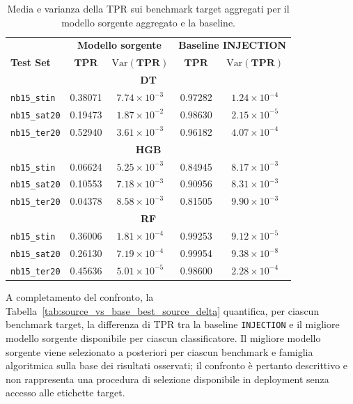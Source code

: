 \begin{table}[H]
    \centering
    \footnotesize
    \caption{Media e varianza della TPR sui benchmark target aggregati per il modello sorgente aggregato e la baseline.}
    \label{tab:source_vs_base_target_variance}
    \begin{tabular}{lcccc}
        \toprule
        & \multicolumn{2}{c}{\textbf{Modello sorgente}} & \multicolumn{2}{c}{\textbf{Baseline INJECTION}} \\
        \textbf{Test Set} & $\boldsymbol{\overline{TPR}}$ & $\boldsymbol{\mathrm{Var}(TPR)}$ & $\boldsymbol{\overline{TPR}}$ & $\boldsymbol{\mathrm{Var}(TPR)}$ \\
        \midrule
        \multicolumn{5}{c}{\textbf{DT}} \\
        \midrule
        \texttt{nb15\_stin}  & 0.38071 & $7.74\times10^{-3}$ & 0.97282 & $1.24\times10^{-4}$ \\
        \texttt{nb15\_sat20} & 0.19473 & $1.87\times10^{-2}$ & 0.98630 & $2.15\times10^{-5}$ \\
        \texttt{nb15\_ter20} & 0.52940 & $3.61\times10^{-3}$ & 0.96182 & $4.07\times10^{-4}$ \\
        \midrule
        \multicolumn{5}{c}{\textbf{HGB}} \\
        \midrule
        \texttt{nb15\_stin}  & 0.06624 & $5.25\times10^{-3}$ & 0.84945 & $8.17\times10^{-3}$ \\
        \texttt{nb15\_sat20} & 0.10553 & $7.18\times10^{-3}$ & 0.90956 & $8.31\times10^{-3}$ \\
        \texttt{nb15\_ter20} & 0.04378 & $8.58\times10^{-3}$ & 0.81505 & $9.90\times10^{-3}$ \\
        \midrule
        \multicolumn{5}{c}{\textbf{RF}} \\
        \midrule
        \texttt{nb15\_stin}  & 0.36006 & $1.81\times10^{-4}$ & 0.99253 & $9.12\times10^{-5}$ \\
        \texttt{nb15\_sat20} & 0.26130 & $7.19\times10^{-4}$ & 0.99954 & $9.38\times10^{-8}$ \\
        \texttt{nb15\_ter20} & 0.45636 & $5.01\times10^{-5}$ & 0.98600 & $2.28\times10^{-4}$ \\
        \bottomrule
    \end{tabular}
\end{table}

A completamento del confronto, la Tabella~\ref{tab:source_vs_base_best_source_delta} quantifica, per ciascun benchmark target, la differenza di TPR tra la baseline \texttt{INJECTION} e il migliore modello sorgente disponibile per ciascun classificatore.
Il migliore modello sorgente viene selezionato a posteriori per ciascun benchmark e famiglia algoritmica sulla base dei risultati osservati; il confronto è pertanto descrittivo e non rappresenta una procedura di selezione disponibile in deployment senza accesso alle etichette target.

